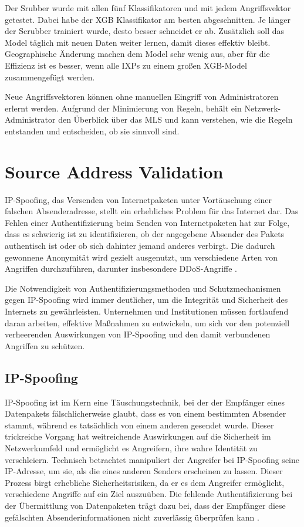 \documentclass[sigplan,screen]{acmart}
\begin{document}
Der Srubber wurde mit allen fünf Klassifikatoren und mit jedem Angriffsvektor getestet. Dabei habe der XGB Klassifikator am besten abgeschnitten. Je länger der Scrubber trainiert wurde, desto besser schneidet er ab. Zusätzlich soll das Model täglich mit neuen Daten weiter lernen, damit dieses effektiv bleibt. Geographische Änderung machen dem Model sehr wenig aus, aber für die Effizienz ist es besser, wenn alle IXPs zu einem großen XGB-Model zusammengefügt werden.

Neue Angriffsvektoren können ohne manuellen Eingriff von Administratoren erlernt werden. Aufgrund der Minimierung von Regeln, behält ein Netzwerk-Administrator den Überblick über das MLS und kann verstehen, wie die Regeln entstanden und entscheiden, ob sie sinnvoll sind.

\section{Source Address Validation}
IP-Spoofing, das Versenden von Internetpaketen unter Vortäuschung einer falschen Absenderadresse, stellt ein erhebliches Problem für das Internet dar. Das Fehlen einer Authentifizierung beim Senden von Internetpaketen hat zur Folge, dass es schwierig ist zu identifizieren, ob der angegebene Absender des Pakets authentisch ist oder ob sich dahinter jemand anderes verbirgt. Die dadurch gewonnene Anonymität wird gezielt ausgenutzt, um verschiedene Arten von Angriffen durchzuführen, darunter insbesondere DDoS-Angriffe \cite{Kor01} \cite{ Gorilla01}.
 
Die Notwendigkeit von Authentifizierungsmethoden und Schutzmechanismen gegen IP-Spoofing wird immer deutlicher, um die Integrität und Sicherheit des Internets zu gewährleisten. Unternehmen und Institutionen müssen fortlaufend daran arbeiten, effektive Maßnahmen zu entwickeln, um sich vor den potenziell verheerenden Auswirkungen von IP-Spoofing und den damit verbundenen Angriffen zu schützen.

\subsection{IP-Spoofing}

IP-Spoofing ist im Kern eine Täuschungstechnik, bei der der Empfänger eines Datenpakets fälschlicherweise glaubt, dass es von einem bestimmten Absender stammt, während es tatsächlich von einem anderen gesendet wurde. Dieser trickreiche Vorgang hat weitreichende Auswirkungen auf die Sicherheit im Netzwerkumfeld und ermöglicht es Angreifern, ihre wahre Identität zu verschleiern.
Technisch betrachtet manipuliert der Angreifer bei IP-Spoofing seine IP-Adresse, um sie, als die eines anderen Senders erscheinen zu lassen. Dieser Prozess birgt erhebliche Sicherheitsrisiken, da er es dem Angreifer ermöglicht, verschiedene Angriffe auf ein Ziel auszuüben. Die fehlende Authentifizierung bei der Übermittlung von Datenpaketen trägt dazu bei, dass der Empfänger diese gefälschten Absenderinformationen nicht zuverlässig überprüfen kann \cite{Beverly01}.
\end{document}
